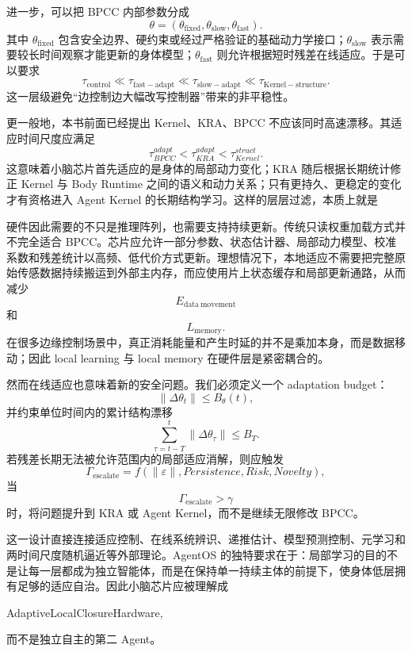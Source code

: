 进一步，可以把 BPCC 内部参数分成
\[
\theta
=
(
\theta_{\mathrm{fixed}},
\theta_{\mathrm{slow}},
\theta_{\mathrm{fast}}
).
\]
其中 $\theta_{\mathrm{fixed}}$ 包含安全边界、硬约束或经过严格验证的基础动力学接口；$\theta_{\mathrm{slow}}$ 表示需要较长时间观察才能更新的身体模型；$\theta_{\mathrm{fast}}$ 则允许根据短时残差在线适应。于是可以要求
\[
\tau_{\mathrm{control}}
\ll
\tau_{\mathrm{fast-adapt}}
\ll
\tau_{\mathrm{slow-adapt}}
\ll
\tau_{\mathrm{Kernel-structure}}.
\]
这一层级避免“边控制边大幅改写控制器”带来的非平稳性。

更一般地，本书前面已经提出 Kernel、KRA、BPCC 不应该同时高速漂移。其适应时间尺度应满足
\[
\tau_{BPCC}^{adapt}
<
\tau_{KRA}^{adapt}
<
\tau_{Kernel}^{struct}.
\]
这意味着小脑芯片首先适应的是身体的局部动力变化；KRA 随后根据长期统计修正 Kernel 与 Body Runtime 之间的语义和动力关系；只有更持久、更稳定的变化才有资格进入 Agent Kernel 的长期结构学习。这样的层层过滤，本质上就是
\begin{statementbox}
\centering
{}
\end{statementbox}

硬件因此需要的不只是推理阵列，也需要支持持续更新。传统只读权重加载方式并不完全适合 BPCC。芯片应允许一部分参数、状态估计器、局部动力模型、校准系数和残差统计以高频、低代价方式更新。理想情况下，本地适应不需要把完整原始传感数据持续搬运到外部主内存，而应使用片上状态缓存和局部更新通路，从而减少
\[
E_{\mathrm{data\ movement}}
\]
和
\[
L_{\mathrm{memory}}.
\]
在很多边缘控制场景中，真正消耗能量和产生时延的并不是乘加本身，而是数据移动；因此 local learning 与 local memory 在硬件层是紧密耦合的。

然而在线适应也意味着新的安全问题。我们必须定义一个 adaptation budget：
\[
\|\Delta\theta_t\|
\leq
B_\theta(t),
\]
并约束单位时间内的累计结构漂移
\[
\sum_{\tau=t-T}^{t}
\|\Delta\theta_\tau\|
\leq
B_T.
\]
若残差长期无法被允许范围内的局部适应消解，则应触发
\[
\Gamma_{\mathrm{escalate}}
=
f(
\|\varepsilon\|,
Persistence,
Risk,
Novelty
),
\]
当
\[
\Gamma_{\mathrm{escalate}}
>
\gamma
\]
时，将问题提升到 KRA 或 Agent Kernel，而不是继续无限修改 BPCC。

这一设计直接连接适应控制、在线系统辨识、递推估计、模型预测控制、元学习和两时间尺度随机逼近等外部理论。AgentOS 的独特要求在于：局部学习的目的不是让每一层都成为独立智能体，而是在保持单一持续主体的前提下，使身体低层拥有足够的适应自治。因此小脑芯片应被理解成
\begin{statementbox}
AdaptiveLocalClosureHardware,
\end{statementbox}
而不是独立自主的第二 Agent。


